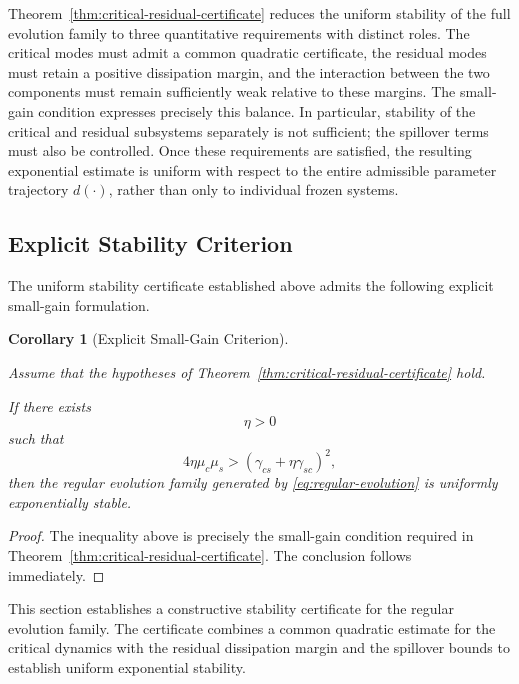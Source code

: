 \documentclass[pdflatex,sn-mathphys-num]{sn-jnl}
\theoremstyle{thmstyleone}%
\theoremstyle{thmstyletwo}%
\theoremstyle{thmstylethree}%
\newtheorem{corollary}{Corollary}
\begin{document}
Theorem~\ref{thm:critical-residual-certificate} reduces the uniform stability of the full evolution family to three quantitative requirements with distinct roles. The critical modes must admit a
common quadratic certificate, the residual modes must retain a positive dissipation margin, and the interaction between the two components must remain sufficiently weak relative to these margins. The small-gain condition expresses precisely this balance. In particular, stability of the critical and residual subsystems separately is not sufficient; the spillover terms must also be controlled. Once these requirements are satisfied, the resulting exponential estimate is uniform with respect to the entire admissible parameter trajectory \(d(\cdot)\), rather than only to individual frozen systems.

\subsection{Explicit Stability Criterion}
\label{subsec:explicit-criterion}

The uniform stability certificate established above admits the following explicit small-gain formulation.

\begin{corollary}[Explicit Small-Gain Criterion]
\label{cor:explicit-small-gain}

Assume that the hypotheses of Theorem~\ref{thm:critical-residual-certificate} hold.

If there exists
\[
\eta>0
\]
such that
\[
4\eta\mu_c\mu_s
>
\left(
\gamma_{cs}
+
\eta\gamma_{sc}
\right)^2,
\]
then the regular evolution family generated by \eqref{eq:regular-evolution} is uniformly exponentially stable.

\end{corollary}

\begin{proof}

The inequality above is precisely the small-gain condition required in Theorem~\ref{thm:critical-residual-certificate}. The conclusion follows immediately.

\end{proof}

This section establishes a constructive stability certificate for the regular evolution family. The certificate combines a common quadratic estimate for the critical dynamics with the residual dissipation margin and the spillover bounds to establish uniform exponential stability.
\end{document}
